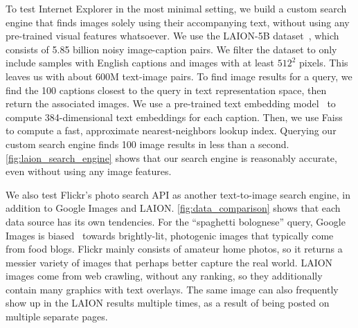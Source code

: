 To test Internet Explorer in the most minimal setting, we build a custom search engine that finds images solely using their accompanying text, without using any pre-trained visual features whatsoever. We use the LAION-5B dataset~\cite{schuhmann2022laion}, which consists of 5.85 billion noisy image-caption pairs. We filter the dataset to only include samples with English captions and images with at least $512^2$ pixels. This leaves us with about 600M text-image pairs. To find image results for a query, we find the 100 captions closest to the query in text representation space, then return the associated images.
We use a pre-trained text embedding model~\cite{reimers2019sentence} to compute 384-dimensional text embeddings for each caption. Then, we use Faiss~\cite{johnson2019billion} to compute a fast, approximate nearest-neighbors lookup index. Querying our custom search engine finds 100 image results in less than a second. \cref{fig:laion_search_engine} shows that our search engine is reasonably accurate, even without using any image features. 

We also test Flickr's photo search API as another text-to-image search engine, in addition to Google Images and LAION. \cref{fig:data_comparison} shows that each data source has its own tendencies. For the ``spaghetti bolognese'' query, Google Images is biased~\cite{mezuman2012learning,chen2015webly} towards brightly-lit, photogenic images that typically come from food blogs. Flickr mainly consists of amateur home photos, so it returns a messier variety of images that perhaps better capture the real world. LAION images come from web crawling, without any ranking, so they additionally contain many graphics with text overlays. The same image can also frequently show up in the LAION results multiple times, as a result of being posted on multiple separate pages. 


